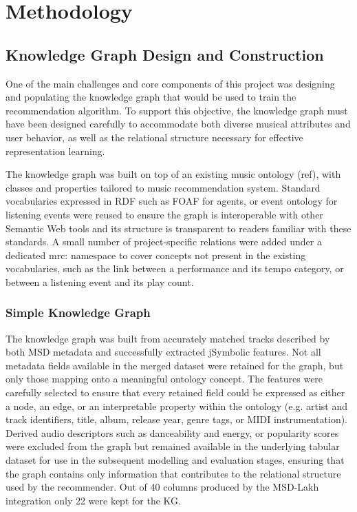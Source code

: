 \section{Methodology}
\label{sec:methodology}

\subsection{Knowledge Graph Design and Construction}

One of the main challenges and core components of this project was designing and populating the knowledge graph that would be used to train the recommendation algorithm. To support this objective, the knowledge graph must have been designed carefully to accommodate both diverse musical attributes and user behavior, as well as the relational structure necessary for effective representation learning.

The knowledge graph was built on top of an existing music ontology (ref), with classes and properties tailored to music recommendation system. Standard vocabularies expressed in RDF such as FOAF for agents, or event ontology for listening events were reused to ensure the graph is interoperable with other Semantic Web tools and its structure is transparent to readers familiar with these standards. A small number of project-specific relations were added under a dedicated mrc: namespace to cover concepts not present in the existing vocabularies, such as the link between a performance and its tempo category, or between a listening event and its play count.

\subsubsection{Simple Knowledge Graph}

The knowledge graph was built from accurately matched tracks described by both MSD metadata and successfully extracted jSymbolic features. Not all metadata fields available in the merged dataset were retained for the graph, but only those mapping onto a meaningful ontology concept. The features were carefully selected to ensure that every retained field could be expressed as either a node, an edge, or an interpretable property within the ontology (e.g. artist and track identifiers, title, album, release year, genre tags, or MIDI instrumentation). Derived audio descriptors such as danceability and energy, or popularity scores were excluded from the graph but remained available in the underlying tabular dataset for use in the subsequent modelling and evaluation stages, ensuring that the graph contains only information that contributes to the relational structure used by the recommender. Out of 40 columns produced by the MSD-Lakh integration only 22 were kept for the KG. 

